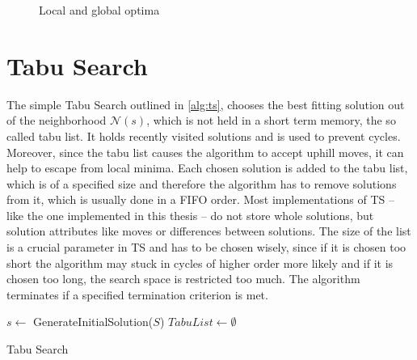 \begin{center}
\begin{figure}
\caption{Local and global optima}
\end{figure}
\end{center}
\section{Tabu Search}
\label{sec:ts}
The simple Tabu Search outlined in \ref{alg:ts}, chooses the best fitting solution out of the neighborhood $\mathcal{N}(s)$, which is not held in a short term memory, the so called tabu list. It holds recently visited solutions and is used to prevent cycles. Moreover, since the tabu list causes the algorithm to accept uphill moves, it can help to escape from local minima. Each chosen solution is added to the tabu list, which is of a specified size and therefore the algorithm has to remove solutions from it, which is usually done in a FIFO order. Most implementations of TS -- like the one implemented in this thesis -- do not store whole solutions, but solution attributes like moves or differences between solutions. The size of the list is a crucial parameter in TS and has to be chosen wisely, since if it is chosen too short the algorithm may stuck in cycles of higher order more likely and if it is chosen too long, the search space is restricted too much. The algorithm terminates if a specified termination criterion is met.\\
\begin{algorithm}[h]
$s \gets$ GenerateInitialSolution($S$)\;
$TabuList \gets \emptyset$
\caption{Tabu Search}
\label{alg:ts}
\end{algorithm}
